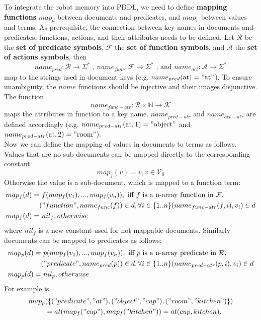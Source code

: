 To integrate the robot memory into PDDL, we need to define 
\textbf{mapping functions} $map_d$ between documents and predicates, and
$map_v$ between values and terms. As prerequisite, the connection
between key-names in documents and predicates, functions, actions, and their
attributes needs to be defined. Let $\mathcal{R}$ be the \textbf{set
  of predicate symbols}, $\mathcal{F}$ the \textbf{set of function
  symbols}, and $\mathcal{A}$ the \textbf{set of actions
  symbols}, then
%
$$name_{pred}: \mathcal{R} \rightarrow \Sigma^*
\text{ , } name_{func}: \mathcal{F} \rightarrow \Sigma^*
\text{ , and } name_{act}: \mathcal{A} \rightarrow \Sigma^*$$
%
map to the strings used in document keys
(e.g. $name_{pred}(\text{at})="\text{at}"$). To ensure unambiguity,
the $name$ functions should
be injective and their images disjunctive. The function
%
$$ name_{func-atr}: \mathcal{R} \times \mathbb{N} \rightarrow
\mathcal{K}$$
%
maps the attributes in function to a key name. $name_{pred-atr}$ and
$name_{act-atr}$ are defined accordingly
(e.g. $name_{pred-atr}(\text{at},1)="\text{object}"$ and
$name_{pred-atr}(\text{at},2)="\text{room}"$).
\\
Now we can define the mapping of values in documents to terms as
follows. Values that are no sub-documents can be mapped directly to
the corresponding constant:
$$map_f(v)=v, v \in \mathcal{V}_0$$
Otherwise the value is a sub-document, which is mapped to a function term:
\begin{align*}
  map_f(d)= &\text{ }f(map_f(v_1), ..., map_f(v_n)), \text{ iff } f \text{ is a n-array function in } \mathcal{F},\\
  &("function", name_{func}(f))\in d,
  \forall i \in \{1..n\} (name_{func-atr}(f,i), v_i)\in d\\
  map_f(d)= &\text{ } nil_f, otherwise\text{~~~~~~~~~~~~~~~}
\end{align*}
where $nil_f$ is a new constant used for not mappable documents.
Similarly documents can be mapped to predicates as follows:
\begin{align*}
  map_p(d)=&\text{ }p(map_f(v_1), ..., map_f(v_n)), \text{ iff } p \text{ is a n-array predicate in } \mathcal{R},\\
  &("predicate", name_{pred}(p))\in d,
  \forall i \in \{1..n\} (name_{pred-atr}(p,i), v_i)\in d\\
  map_p(d)=& \text{ }nil_p, otherwise\text{~~~~~~~~~~~~~~~}
\end{align*}
For example is
\begin{align*}
map_p&(\{("predicate", "at"),("object", "cup"),("room",
"kitchen")\})\\
&= at(map_f("cup"), map_f("kitchen")) = at(cup, kitchen) \text{.}
\end{align*}
